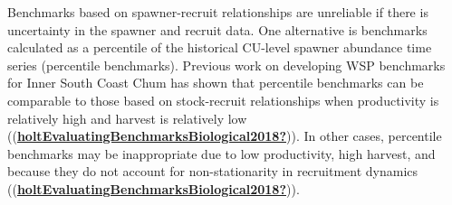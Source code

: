 \documentclass[11pt]{book}
\begin{document}
Benchmarks based on spawner-recruit relationships are unreliable if there is uncertainty in the spawner and recruit data. One alternative is benchmarks calculated as a percentile of the historical CU-level spawner abundance time series (percentile benchmarks). Previous work on developing WSP benchmarks for Inner South Coast Chum has shown that percentile benchmarks can be comparable to those based on stock-recruit relationships when productivity is relatively high and harvest is relatively low ((\protect\hyperlink{ref-holtEvaluatingBenchmarksBiological2018}{\textbf{holtEvaluatingBenchmarksBiological2018?}})). In other cases, percentile benchmarks may be inappropriate due to low productivity, high harvest, and because they do not account for non-stationarity in recruitment dynamics ((\protect\hyperlink{ref-holtEvaluatingBenchmarksBiological2018}{\textbf{holtEvaluatingBenchmarksBiological2018?}})).
\end{document}
